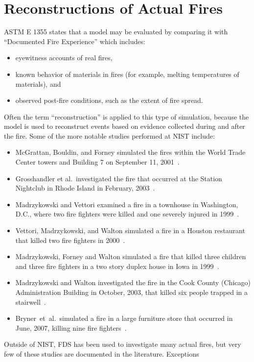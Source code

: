 \section{Reconstructions of Actual Fires}

ASTM E 1355 states that a model may be evaluated by comparing it with ``Documented Fire Experience'' which includes:
\begin{itemize}
\item eyewitness accounts of real fires,
\item known behavior of materials in fires (for example, melting temperatures of materials), and
\item observed post-fire conditions, such as the extent of fire spread.
\end{itemize}
Often the term ``reconstruction'' is applied to this type of simulation, because the model is used to reconstruct events based on evidence collected during and after the fire. Some of the more notable studies performed at NIST include:
\begin{itemize}
\item McGrattan, Bouldin, and Forney simulated the fires within the World Trade Center towers and Building 7 on September 11, 2001~\cite{NIST_NCSTAR_1-5F}.
\item Grosshandler et al.~investigated the fire that occurred at the Station Nightclub in Rhode Island in February, 2003~\cite{Grosshandler:Station}.
\item Madrzykowski and Vettori examined a fire in a townhouse in Washington, D.C., where two fire fighters were killed and one severely injured in 1999~\cite{Madrzykowski:1}.
\item Vettori, Madrzykowski, and Walton simulated a fire in a Houston restaurant that killed two fire fighters in 2000~\cite{Texas}.
\item Madrzykowski, Forney and Walton simulated a fire that killed three children and three fire fighters in a two story duplex house in Iowa in 1999~\cite{Iowa}.
\item Madrzykowski and Walton investigated the fire in the Cook County (Chicago) Administration Building in October, 2003, that killed six people trapped in a stairwell~\cite{Cook_County}.
\item Bryner~et~al.~simulated a fire in a large furniture store that occurred in June, 2007, killing nine fire fighters~\cite{Bryner:Charleston}.
\end{itemize}
Outside of NIST, FDS has been used to investigate many actual fires, but very few of these studies are documented in the literature. Exceptions
